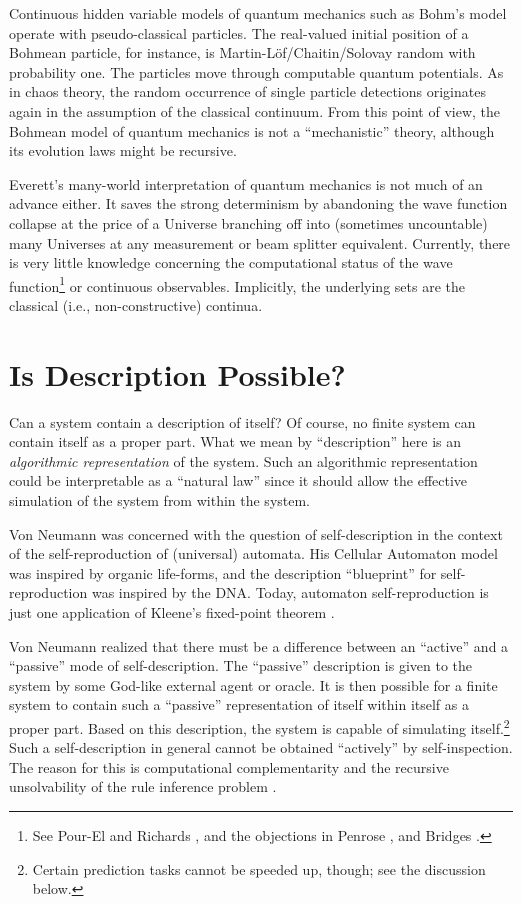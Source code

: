 Continuous hidden variable models of quantum mechanics such as Bohm's
model \cite{bohm} operate with pseudo-classical particles. The
real-valued initial position of a Bohmean particle, for instance, is
Martin-L\"of/Chaitin/Solovay
random with probability one. The particles move through
computable quantum potentials.
As in chaos theory, the random occurrence of single particle
detections  originates again in the assumption of the classical
continuum.
From this point of view, the Bohmean model of quantum mechanics is not a
``mechanistic'' theory, although its evolution laws might be recursive.


Everett's many-world interpretation of quantum mechanics
\cite{everett} is not much of an advance either. It saves
the strong determinism by abandoning the wave function collapse at
the price of a Universe branching off into (sometimes uncountable) many
Universes at any measurement or beam splitter equivalent.
Currently, there is very little knowledge concerning the computational
status of the
wave function\footnote{See Pour-El and Richards \cite{pour-el},
and the objections in Penrose \cite{penrose}, and Bridges
\cite{bridges1}.} or continuous observables. Implicitly, the
underlying sets are the classical (i.e., non-constructive) continua.



\section{Is Description Possible?}

Can a system contain a description of itself?
Of course, no finite system can contain
itself as a proper part.
What we mean by ``description'' here is an {\em algorithmic
representation} of the system. Such an algorithmic representation could
be interpretable as  a ``natural law''  since it should allow the effective
simulation of the system from within the system.

Von Neumann
\cite{burks}
was concerned with the question of self-description in
the context of the self-reproduction of (universal) automata.
His Cellular Automaton model was inspired by organic life-forms, and the
description ``blueprint'' for self-reproduction was inspired by the DNA.
Today, automaton self-reproduction is just one application
of Kleene's fixed-point theorem
\cite{rogers,odi:89}.

 Von Neumann realized that there must be a difference between an
``active'' and a ``passive'' mode of self-description.
The ``passive'' description is given to the system by some
God-like external agent or oracle. It is then
possible for a finite system to contain such a ``passive''
representation of itself within  itself
as a proper part. Based on this description, the system is capable of
simulating itself.\footnote{Certain prediction tasks cannot
be speeded up, though;
see the
discussion below.}
Such a self-description in general cannot be obtained ``actively'' by
self-inspection.
The reason for this is computational complementarity \cite{moore,svozil}
and the recursive unsolvability of the rule inference problem
\cite{gold,svozil}.



